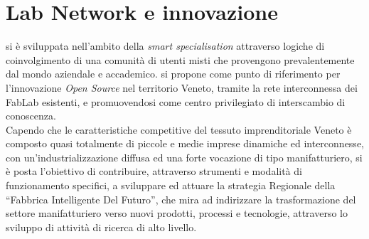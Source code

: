 \section{Lab Network e innovazione}
\lab{} si è sviluppata nell’ambito della \textit{smart specialisation} attraverso logiche di coinvolgimento di una comunità di utenti misti che provengono prevalentemente dal mondo aziendale e accademico. 
\lab{} si propone come punto di riferimento per l’innovazione \textit{Open Source} nel territorio Veneto, tramite la rete interconnessa dei \gls{FabLab} esistenti, e promuovendosi come centro privilegiato di interscambio di conoscenza.\\
Capendo che le caratteristiche competitive del tessuto imprenditoriale Veneto è composto quasi totalmente di piccole e medie imprese dinamiche ed interconnesse, con un’industrializzazione diffusa ed una forte vocazione di tipo manifatturiero, \lab{} si è posta l’obiettivo di contribuire, attraverso strumenti e modalità di funzionamento specifici, a sviluppare ed attuare la strategia Regionale della ``Fabbrica Intelligente Del Futuro'', che mira ad indirizzare la trasformazione del settore manifatturiero verso nuovi prodotti, processi e tecnologie, attraverso lo sviluppo di attività di ricerca di alto livello.